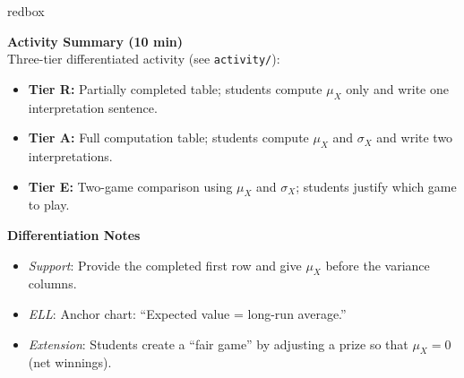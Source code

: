 \documentclass[10pt]{article}
\begin{document}
\begin{skillbox}{redbox}
\begin{minipage}[t]{0.48\linewidth}
    \textbf{Activity Summary (10 min)}\\
    Three-tier differentiated activity (see \texttt{activity/}):
    \begin{itemize}
        \item \textbf{Tier R:} Partially completed table; students compute $\mu_X$ only
              and write one interpretation sentence.
        \item \textbf{Tier A:} Full computation table; students compute $\mu_X$ and
              $\sigma_X$ and write two interpretations.
        \item \textbf{Tier E:} Two-game comparison using $\mu_X$ and $\sigma_X$;
              students justify which game to play.
    \end{itemize}
\end{minipage}
\hfill
\begin{minipage}[t]{0.48\linewidth}
    \textbf{Differentiation Notes}
    \begin{itemize}
        \item \textit{Support}: Provide the completed first row and give $\mu_X$ before
              the variance columns.
        \item \textit{ELL}: Anchor chart: ``Expected value = long-run average.''
        \item \textit{Extension}: Students create a ``fair game'' by adjusting a
              prize so that $\mu_X = 0$ (net winnings).
    \end{itemize}
\end{minipage}
\end{skillbox}
\end{document}
